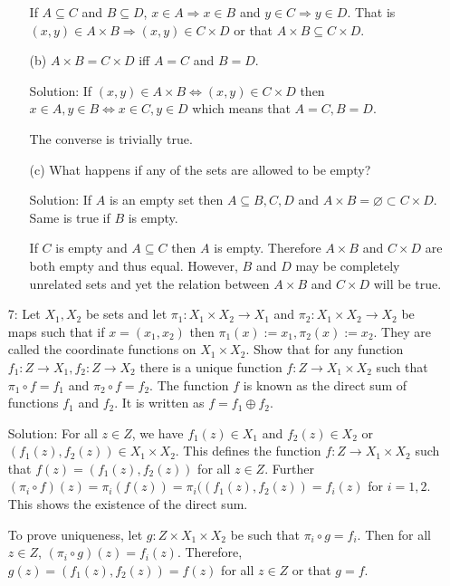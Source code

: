 \begin{enumerate}
\begin{enumerate}
If $A \subseteq C$ and $B \subseteq D$, $x \in A \Rightarrow x \in B$
and $y \in C \Rightarrow y \in D$. That is $(x, y) \in A \times B 
\Rightarrow (x, y) \in C \times D$ or that $A \times B \subseteq C \times
D$.

\item[(b)] $A \times B = C \times D$ iff $A = C$ and $B = D$.
\item[Solution:] If $(x, y) \in A \times B \Leftrightarrow (x, y) \in
C \times D$ then $x \in A, y \in B \Leftrightarrow x \in C, y \in D$
which means that $A = C, B = D$.

The converse is trivially true.

\item[(c)] What happens if any of the sets are allowed to be empty?
\item[Solution:] If $A$ is an empty set then $A \subseteq B, C, D$ and
$A \times B = \varnothing \subset C \times D$. Same is true if $B$ is
empty.

If $C$ is empty and $A \subseteq C$ then $A$ is empty. Therefore $A \times
B$ and $C \times D$ are both empty and thus equal. However, $B$ and $D$
may be completely unrelated sets and yet the relation between $A \times B$
and $C \times D$ will be true.
\end{enumerate}

\item[7:] Let $X_1, X_2$ be sets and let $\pi_1: X_1 \times X_2 
\rightarrow X_1$ and $\pi_2: X_1 \times X_2 \rightarrow X_2$ be maps such 
that if $x = (x_1, x_2)$ then $\pi_1(x) := x_1, \pi_2(x) := x_2$. They
are called the coordinate functions on $X_1 \times X_2$. Show that for
any function $f_1: Z \rightarrow X_1, f_2: Z \rightarrow X_2$ there is a
unique function $f: Z \rightarrow X_1 \times X_2$ such that $\pi_1 \circ
f = f_1$ and $\pi_2 \circ f = f_2$. The function $f$ is known as the
direct sum of functions $f_1$ and $f_2$. It is written as $f = f_1 \oplus
f_2$.
\item[Solution:] For all $z \in Z$, we have $f_1(z) \in X_1$ and $f_2(z)
\in X_2$ or $(f_1(z), f_2(z)) \in X_1 \times X_2$. This defines the
function $f: Z \rightarrow X_1 \times X_2$ such that $f(z) = (f_1(z),
f_2(z))$ for all $z \in Z$. Further $(\pi_i \circ f)(z) = \pi_i(f(z))
= \pi_i((f_1(z), f_2(z)) = f_i(z)$ for $i = 1, 2$. This shows the 
existence of the direct sum.

To prove uniqueness, let $g: Z \times X_1 \times X_2$ be such that $\pi_i
\circ g = f_i$. Then for all $z \in Z$, $(\pi_i \circ g)(z) = f_i(z)$.
Therefore, $g(z) = (f_1(z), f_2(z)) = f(z)$ for all $z \in Z$ or that 
$g = f$.


\end{enumerate}

